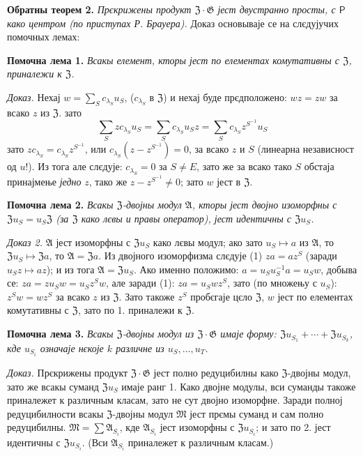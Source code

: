 \documentclass[11pt]{article}
\begin{document}
\noindent\textbf{Обратны теорем 2.} \emph{Прєкрижены продукт \(\mathfrak Z\cdot\mathfrak G\) јест двустранно просты, с \(\mathsf{P}\) како центром (по приступах Р. Брауера).} Доказ основываје се на слєдујучих помочных лемах:

\noindent\textbf{Помочна лема 1.} \emph{Всакы елемент, кторы јест по елементах комутативны с \(\mathfrak Z\), приналежи к \(\mathfrak Z\).}

\noindent\emph{Доказ.} Нехај \(w=\sum_S c_{\lambda_S}u_S\), (\(c_{\lambda_S}\) в \(\mathfrak Z\)) и нехај буде прєдположено: \(wz=zw\) за всако \(z\) из \(\mathfrak Z\). зато
\[
\sum_S zc_{\lambda_S}u_S
 =\sum_S c_{\lambda_S}u_Sz
 =\sum_S c_{\lambda_S}z^{S^{-1}}u_S
\]
зато \(zc_{\lambda_S}=c_{\lambda_S}z^{S^{-1}}\), или \(c_{\lambda_S}(z-z^{S^{-1}})=0\), за всако \(z\) и \(S\) (линеарна независност од \(u\)!). Из тога але слєдује: \(c_{\lambda_S}=0\) за \(S\neq E\), зато же за всако тако \(S\) обстаја принајмење \emph{једно} \(z\), тако же \(z-z^{S^{-1}}\neq0\); зато \(w\) јест в \(\mathfrak Z\).

\noindent\textbf{Помочна лема 2.} \emph{Всакы \(\mathfrak Z\)-двојны модул \(\mathfrak A\), кторы јест двојно изоморфны с \(\mathfrak Zu_S=u_S\mathfrak Z\) (за \(\mathfrak Z\) како лєвы и правы оператор), јест идентичны с \(\mathfrak Zu_S\).}

\noindent\emph{Доказ 2.} \(\mathfrak A\) јест изоморфны с \(\mathfrak Zu_S\) како лєвы модул; ако зато \(u_S\mapsto a\) из \(\mathfrak A\), то \(\mathfrak Zu_S\mapsto\mathfrak Za\), то \(\mathfrak A=\mathfrak Za\). Из двојного изоморфизма слєдује (1) \(za=az^S\) (заради \(u_Sz\mapsto az\)); и из тога \(\mathfrak A=\mathfrak Zu_S\). Ако именно положимо: \(a=u_Su_S^{-1}a=u_Sw\), добыва се: \(za=zu_Sw=u_Sz^Sw\), але заради (1): \(za=u_Swz^S\), зато (по множењу с \(u_S\)): \(z^Sw=wz^S\) за всако \(z\) из \(\mathfrak Z\). Зато такоже \(z^S\) пробєгаје цєло \(\mathfrak Z\), \(w\) јест по елементах комутативны с \(\mathfrak Z\), зато по 1. приналежи к \(\mathfrak Z\).

\noindent\textbf{Помочна лема 3.} \emph{Всакы \(\mathfrak Z\)-двојны модул из \(\mathfrak Z\cdot\mathfrak G\) имаје форму: \(\mathfrak Zu_{S_1}+\cdots+\mathfrak Zu_{S_k}\), кде \(u_{S_i}\) означаје нєкоје \(k\) различне из \(u_S,\ldots,u_T\).}

\noindent\emph{Доказ.} Прєкрижены продукт \(\mathfrak Z\cdot\mathfrak G\) јест полно редуцибилны како \(\mathfrak Z\)-двојны модул, зато же всакы суманд \(\mathfrak Zu_S\) имаје ранг 1. Како двојне модулы, вси суманды такоже приналежет к различным класам, зато не сут двојно изоморфне. Заради полној редуцибилности всакы \(\mathfrak Z\)-двојны модул \(\mathfrak M\) јест прємы суманд и сам полно редуцибилны. \(\mathfrak M=\sum\mathfrak A_{S_i}\), кде \(\mathfrak A_{S_i}\) јест изоморфны с \(\mathfrak Zu_{S_i}\); и зато по 2. јест идентичны с \(\mathfrak Zu_{S_i}\). (Вси \(\mathfrak A_{S_i}\) приналежет к различным класам.)
\end{document}
